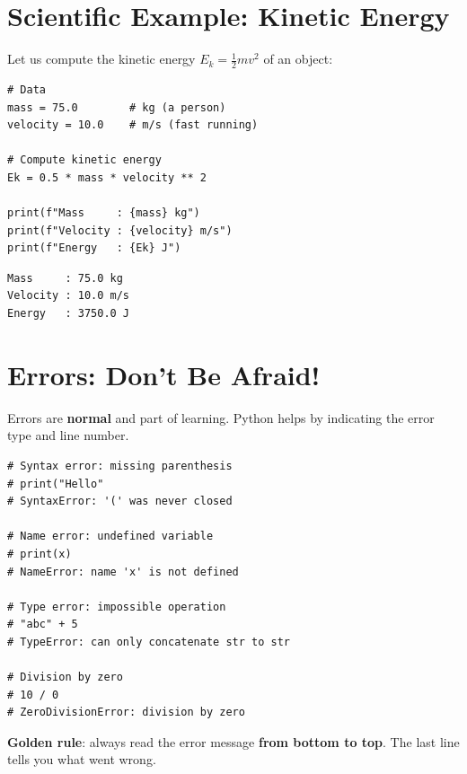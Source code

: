\section{Scientific Example: Kinetic Energy}

Let us compute the kinetic energy $E_k = \frac{1}{2}mv^2$ of an object:

\begin{codeblock}[title=\textbf{Python --- Kinetic energy}]
\begin{verbatim}
# Data
mass = 75.0        # kg (a person)
velocity = 10.0    # m/s (fast running)

# Compute kinetic energy
Ek = 0.5 * mass * velocity ** 2

print(f"Mass     : {mass} kg")
print(f"Velocity : {velocity} m/s")
print(f"Energy   : {Ek} J")
\end{verbatim}
\end{codeblock}

\begin{codeoutput}
\begin{verbatim}
Mass     : 75.0 kg
Velocity : 10.0 m/s
Energy   : 3750.0 J
\end{verbatim}
\end{codeoutput}

\section{Errors: Don't Be Afraid!}

\begin{errmark}
Errors are \textbf{normal} and part of learning. Python helps by indicating the error type and line number.

\begin{codeblock}[title=\textbf{Python --- Common errors}]
\begin{verbatim}
# Syntax error: missing parenthesis
# print("Hello"
# SyntaxError: '(' was never closed

# Name error: undefined variable
# print(x)
# NameError: name 'x' is not defined

# Type error: impossible operation
# "abc" + 5
# TypeError: can only concatenate str to str

# Division by zero
# 10 / 0
# ZeroDivisionError: division by zero
\end{verbatim}
\end{codeblock}

\textbf{Golden rule}: always read the error message \textbf{from bottom to top}. The last line tells you what went wrong.
\end{errmark}

